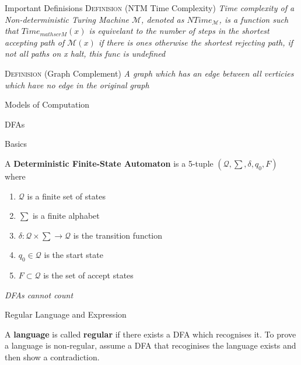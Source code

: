 \documentclass[12pt, letterpaper]{article}
\begin{document}
\begin{section}{Important Definisions}
  \textsc{Definision} (NTM Time Complexity) \textit{Time complexity
    of a Non-deterministic Turing Machine \(\mathscr{M}\), denoted as \(NTime_{\mathscr{M}}\),
    is a function such that \(Time_{mathscr{M}}(x)\) is equivelant to the
    number of steps in the shortest accepting path of \(\mathscr{M}(x)\) if there is ones
    otherwise the shortest rejecting path, if not all paths on x halt, this func is undefined}

  \textsc{Definision} (Graph Complement) \textit{A graph which has an edge
    between all verticies which have no edge in the original graph}

\end{section}

\begin{section}{Models of Computation}

  \begin{subsection}{DFAs}

    \begin{subsubsection}{Basics}

      A \textbf{Deterministic Finite-State Automaton} is a 5-tuple
      \((\mathcal{Q}, \sum, \delta, q_{0}, F)\) where
      \begin{enumerate}
        \item \(\mathcal{Q}\) is a finite set of states
        \item \(\sum\) is a finite alphabet
        \item \(\delta: \mathcal{Q} \times \sum \to \mathcal{Q}\) is the
              transition function
        \item \(q_{0} \in \mathcal{Q}\) is the start state
        \item \(F \subset \mathcal{Q}\) is the set of accept states
      \end{enumerate}

      \emph{DFAs cannot count}

    \end{subsubsection}

    \begin{subsubsection}{Regular Language and Expression}

      A \textbf{language} is called \textbf{regular} if there exists a DFA which
      recognises it.
      To prove a language is non-regular, assume a DFA that recoginises the
      language exists and then show a contradiction.


\end{subsubsection}
\end{subsection}
\end{section}
\end{document}
